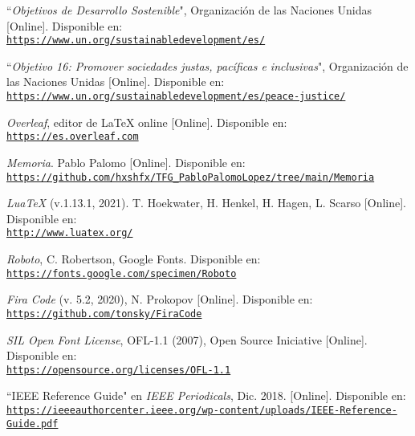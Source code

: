 \begin{thebibliography}{X}
            ``\textit{Objetivos de Desarrollo Sostenible}", Organización de las Naciones Unidas [Online]. Disponible en:
            \\ \texttt{\url{https://www.un.org/sustainabledevelopment/es/}}
            
            ``\textit{Objetivo 16: Promover sociedades justas, pacíficas e inclusivas}", Organización de las Naciones Unidas [Online]. Disponible en:
            \\ \texttt{\url{https://www.un.org/sustainabledevelopment/es/peace-justice/}}
            
            \textit{Overleaf}, editor de LaTeX online [Online]. Disponible en:
            \\ \texttt{\url{https://es.overleaf.com}}
            
            \textit{Memoria}. Pablo Palomo [Online]. Disponible en:
            \\ \texttt{\url{https://github.com/hxshfx/TFG_PabloPalomoLopez/tree/main/Memoria}}
            
            \textit{LuaTeX} (v.1.13.1, 2021). T. Hoekwater, H. Henkel, H. Hagen, L. Scarso [Online]. Disponible en:
            \\ \texttt{\url{http://www.luatex.org/}}
            
            \textit{Roboto}, C. Robertson, Google Fonts. Disponible en:
            \\ \texttt{\url{https://fonts.google.com/specimen/Roboto}}
            
            \textit{Fira Code} (v. 5.2, 2020), N. Prokopov [Online]. Disponible en:
            \\ \texttt{\url{https://github.com/tonsky/FiraCode}}
            
            \textit{SIL Open Font License}, OFL-1.1 (2007), Open Source Iniciative [Online]. Disponible en:
            \\ \texttt{\url{https://opensource.org/licenses/OFL-1.1}}
            
            ``IEEE Reference Guide" en \textit{IEEE Periodicals}, Dic. 2018. [Online]. Disponible en:
            \\ \texttt{\url{https://ieeeauthorcenter.ieee.org/wp-content/uploads/IEEE-Reference-Guide.pdf}}
        
    \end{thebibliography}
\endgroup

\newpage